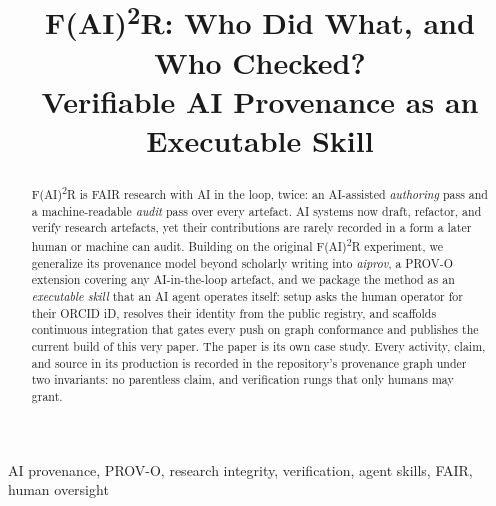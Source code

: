 \documentclass[conference]{IEEEtran}
\begin{document}
\title{F(AI)\textsuperscript{2}R: Who Did What, and Who Checked?\\
Verifiable AI Provenance as an Executable Skill}

\author{
}

\maketitle

\begin{abstract}
F(AI)\textsuperscript{2}R is FAIR research with AI in the loop,
twice: an AI-assisted \emph{authoring} pass and a machine-readable
\emph{audit} pass over every artefact. AI systems now draft, refactor,
and verify research artefacts, yet their
contributions are rarely recorded in a form a later human or machine can
audit. Building on the original F(AI)\textsuperscript{2}R
experiment, we generalize its provenance model beyond scholarly writing into
\emph{aiprov}, a PROV-O extension covering any AI-in-the-loop artefact,
and we package the method as an \emph{executable skill} that an AI agent
operates itself: setup asks the human operator for their ORCID iD,
resolves their identity from the public registry, and scaffolds continuous
integration that gates every push on graph conformance and publishes the
current build of this very paper. The paper is its own case study. Every
activity, claim, and source in its production is recorded in the
repository's provenance graph under two invariants: no parentless claim,
and verification rungs that only humans may grant.
\end{abstract}

\begin{IEEEkeywords}
AI provenance, PROV-O, research integrity, verification, agent
skills, FAIR, human oversight
\end{IEEEkeywords}









\end{document}
